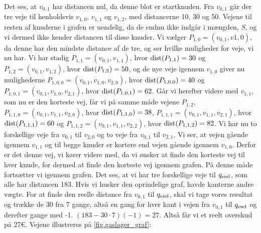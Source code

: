  


Det ses, at $v_{0,1}$ har distancen nul, da denne blot er startknuden. Fra $v_{0,1}$ går der tre veje til henholdsvis $v_{1,0}$, $v_{1,1}$ og $v_{1,2}$, med distancerne 10, 30 og 50. Vejene til resten af knuderne i grafen er uendelig, da de endnu ikke indgår i mængden, $S$, og vi dermed ikke kender distancen til disse knuder. Vi vælger $P_{1,0}=(v_{0,1}, v{1,0})$, da denne har den mindste distance af de tre, og ser hvilke muligheder for veje, vi nu har. Vi har stadig $P_{1,1}=(v_{0,1},v_{1,1})$, hvor $\textrm{dist}(P_{1,1})=30$ og $P_{1,2}=(v_{0,1},v_{1,2})$, hvor $\textrm{dist}(P_{1,2})=50$, og de nye veje igennem $v_{1,0}$ giver nu mulighederne $P_{1,0,0}=(v_{0,1},v_{1,0},v_{2,0})$, hvor $\textrm{dist}(P_{1,0,0})=40$ og $P_{1,0,1}=(v_{0,1},v_{1,0},v_{2,1})$, hvor $\textrm{dist}(P_{1,0,1})=62$. Går vi herefter videre med $v_{1,1}$, som nu er den korteste vej, får vi på samme måde vejene $P_{1,2}$, $P_{1,1,0}=(v_{0,1},v_{1,1},v_{2,0})$, hvor $\textrm{dist}(P_{1,1,0})=38$, $P_{1,1,1}=(v_{0,1},v_{1,1},v_{2,1})$, hvor $\textrm{dist}(P_{1,1,1})=60$ og $P_{1,1,2}=(v_{0,1},v_{1,1},v_{2,2})$, hvor $\textrm{dist}(P_{1,1,2})=82$. Vi har nu to forskellige veje fra $v_{0,1}$ til $v_{2,0}$ og to veje fra $v_{0,1}$ til $v_{2,1}$. Vi ser, at vejen gående igennem $v_{1,1}$ og til begge knuder er kortere end vejen gående igennem $v_{1,0}$. Derfor er det denne vej, vi kører videre med, da vi ønsker at finde den korteste vej til hver knude, for dermed at finde den korteste vej igennem grafen. På denne måde fortsætter vi igennem grafen. Det ses, at vi har tre forskellige veje til $q_{\textrm{end}}$, som alle har distancen 183. Hvis vi husker den oprindelige graf, havde kanterne andre vægte. For at finde den reelle distance fra $v_{0,1}$ til $q_{\textrm{end}}$, skal vi tage vores resultat og trække de 30 fra 7 gange, altså en gang for hver kant i vejen fra $v_{0,1}$ til $q_{\textrm{end}}$ og derefter gange med -1.
$(183-30 \cdot 7) (-1) = 27$. Altså får vi et reelt overskud på 27€.
Vejene illustreres på \autoref{fig.gaslager_graf}:





